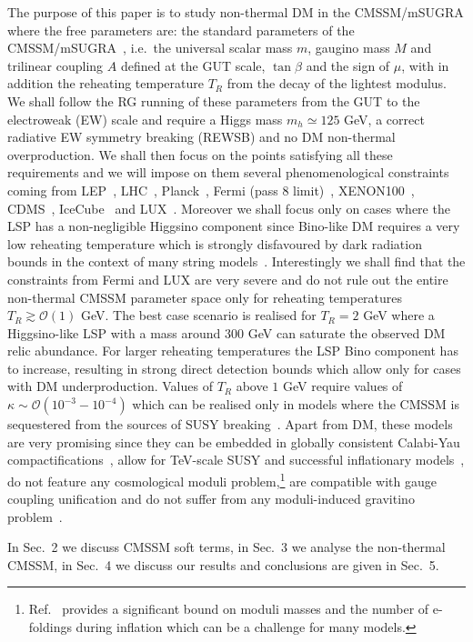 \documentclass[11pt,a4paper]{article}
\newcommand{\mc}{\mathcal}
\begin{document}
The purpose of this paper is to study non-thermal DM in the CMSSM/mSUGRA where the free parameters are: the standard parameters of the CMSSM/mSUGRA~\cite{msugra},
i.e.~the universal scalar mass $m$, gaugino mass $M$ and trilinear coupling $A$ defined at the GUT scale, $\tan\beta$ and the sign of $\mu$, with in addition the reheating temperature $T_R$ from the decay of the lightest modulus. We shall follow the RG running of these parameters from the GUT to the electroweak (EW) scale and require a Higgs mass $m_h \simeq 125$ GeV, a correct radiative EW symmetry breaking (REWSB) and no DM non-thermal overproduction.
We shall then focus on the points satisfying all these requirements and we will impose on them several phenomenological constraints coming
from LEP~\cite{lep}, LHC~\cite{lhc}, Planck~\cite{planck}, Fermi (pass 8 limit)~\cite{fermi}, XENON100~\cite{xenon}, CDMS~\cite{cdms}, IceCube~\cite{icecube} and LUX~\cite{lux}. Moreover we shall focus only on cases where the LSP has a non-negligible Higgsino component since Bino-like DM requires a very low reheating temperature which is strongly disfavoured by dark radiation bounds in the context of many string models~\cite{Allahverdi:2014ppa}. Interestingly we shall find that the constraints from Fermi and LUX are very severe and do not rule out the entire non-thermal CMSSM parameter space only for reheating temperatures $T_R\gtrsim \mc{O}(1)$ GeV. The best case scenario is realised for $T_R = 2$ GeV where a Higgsino-like LSP with a mass around $300$ GeV can saturate the observed DM relic abundance. For larger reheating temperatures the LSP Bino component has to increase, resulting in strong direct detection bounds which allow only for cases with DM underproduction. Values of $T_R$ above $1$ GeV require 
values of $\kappa\sim\mc{O}(10^{-3}-10^{-4})$ which can be realised only in models where the CMSSM is sequestered from the sources of SUSY breaking~\cite{seqLVS, Aparicio:2014wxa}. Apart from DM, these models are very promising since they can be embedded in globally consistent Calabi-Yau compactifications~\cite{CYembedding}, allow for TeV-scale SUSY and successful inflationary models~\cite{KMI}, do not feature any cosmological moduli problem,\footnote{Ref.~\cite{Dutta2015x} provides a significant bound on moduli masses and the number of e-foldings during inflation which can be a challenge for many models.} are compatible with gauge coupling unification and do not suffer from any moduli-induced gravitino problem~\cite{gravProbl}.

In Sec.~2 we discuss CMSSM soft terms, in Sec.~3 we analyse the
non-thermal CMSSM, in Sec.~4 we discuss our results and conclusions are
given in Sec.~5.
\end{document}
